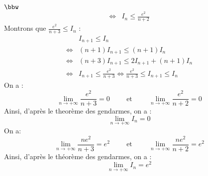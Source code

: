 \documentclass[11pt]{article}
\begin{document}
\begin{exercice}{$\bbw$}{}
\begin{align*}
        \iff&I_n \leq \frac{e^2}{n+2}
    \end{align*}
    Montrons que $\frac{e^2}{n+3} \leq I_n$ :
    \begin{align*}
        &I_{n+1} \leq I_n\\
        \iff&(n+1)I_{n+1} \leq (n+1)I_n\\
        \iff&(n+3)I_{n+1} \leq 2I_{n+1} + (n+1)I_n\\
        \iff&I_{n+1} \leq \frac{e^2}{n+3} \iff \frac{e^2}{n+3} \leq I_{n+1} \leq I_n
    \end{align*}
     On a :
    \begin{equation*}
        \lim\limits_{n\to+\infty}{\frac{e^2}{n+3}}=0 \hspace{1cm} \text{et} \hspace{1cm} \lim\limits_{n\to+\infty}{\frac{e^2}{n+2}}=0
    \end{equation*} 
    Ainsi, d'après le theorème des gendarmes, on a :
    \begin{equation*}
        \lim\limits_{n\to+\infty}{I_n}=0
    \end{equation*}
    On a: 
    \begin{equation*}
        \lim\limits_{n\to+\infty}{\frac{ne^2}{n+3}}=e^2 \hspace{1cm} \text{et} \hspace{1cm} \lim\limits_{n\to+\infty}{\frac{ne^2}{n+2}}=e^2
    \end{equation*} 
    Ainsi, d'après le théorème des gendarmes, on a :
    \begin{equation*}
        \lim\limits_{n\to+\infty}{I_n}=e^2
    \end{equation*}
\end{exercice}

\pagebreak
\end{document}
